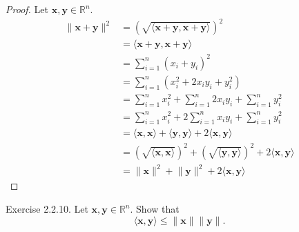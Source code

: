 \documentclass{article}
\theoremstyle{plain}
\begin{document}
\begin{proof}
  Let
  \begin{math}
    \bm{x} , \bm{y} \in \mathbb{R}^n .
  \end{math}
  \begin{equation*}
    \begin{split}
      \lVert \bm{x} + \bm{y} \rVert^2 &= \left( \sqrt{\langle \bm{x} + \bm{y} , \bm{x} + \bm{y} \rangle} \right)^2 \\
      &= \langle \bm{x} + \bm{y} , \bm{x} + \bm{y} \rangle \\
      &= \sum_{i=1}^n (x_i + y_i)^2 \\
      &= \sum_{i=1}^n (x_i^2 + 2 x_i y_i + y_i^2) \\
      &= \sum_{i=1}^n x_i^2 + \sum_{i=1}^n 2 x_i y_i + \sum_{i=1}^n y_i^2 \\
      &= \sum_{i=1}^n x_i^2 + 2 \sum_{i=1}^n x_i y_i + \sum_{i=1}^n y_i^2 \\
      &= \langle \bm{x} , \bm{x} \rangle + \langle \bm{y} , \bm{y} \rangle + 2 \langle \bm{x} , \bm{y} \rangle \\
      &= \left( \sqrt{\langle \bm{x} , \bm{x} \rangle} \right)^2 + \left( \sqrt{\langle \bm{y} , \bm{y} \rangle} \right)^2 + 2 \langle \bm{x} , \bm{y} \rangle \\
      &= \lVert \bm{x} \rVert^2 + \lVert \bm{y} \rVert^2 + 2 \langle \bm{x} , \bm{y}\rangle
    \end{split}
  \end{equation*}
\end{proof}


\begin{itembox}[l]{Exercise 2.2.10.}
  Let
  \begin{math}
    \bm{x} , \bm{y} \in \mathbb{R}^n .
  \end{math}
  Show that
  \begin{equation}
    \label{ex2210}
    \langle \bm{x} , \bm{y} \rangle \leq \lVert \bm{x} \rVert \lVert \bm{y} \rVert .
  \end{equation}
\end{itembox}
\end{document}
